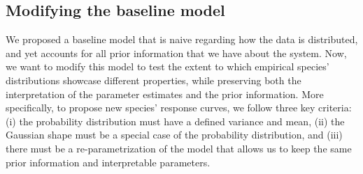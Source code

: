 \documentclass[11pt, a4paper]{article}
\begin{document}
\subsection*{Modifying the baseline model}
We proposed a baseline model that is naive regarding how the data is distributed, and yet accounts for all prior information that we have about the system. Now, we want to modify this model to test the extent to which empirical species' distributions showcase different properties, while preserving both the interpretation of the parameter estimates and the prior information. More specifically, to propose new species' response curves, we follow three key criteria: (i) the probability distribution must have a defined variance and mean, (ii) the Gaussian shape must be a special case of the probability distribution, and (iii) there must be a re-parametrization of the model that allows us to keep the same prior information and interpretable parameters.
\end{document}
